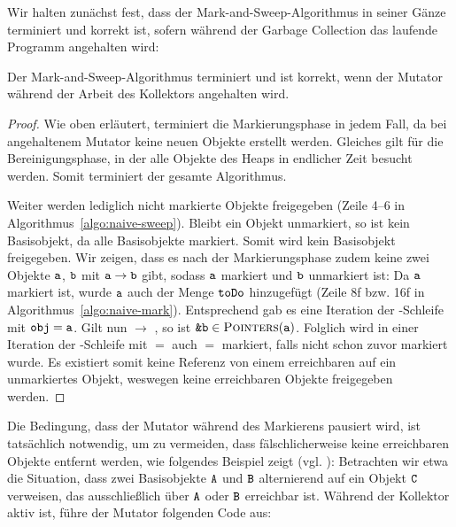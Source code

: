 Wir halten zunächst fest, dass der Mark-and-Sweep-Algorithmus in seiner Gänze terminiert und korrekt ist, sofern während der Garbage Collection das laufende Programm angehalten wird:

\begin{mybox}
\begin{satz}
	\label{satz:mark-sweep-correctness}
	Der Mark-and-Sweep-Algorithmus terminiert und ist korrekt, wenn der Mutator während der Arbeit des Kollektors angehalten wird.
\end{satz}
\end{mybox}

\begin{proof}
	Wie oben erläutert, terminiert die Markierungsphase in jedem Fall, da bei angehaltenem Mutator keine neuen Objekte erstellt werden.
	Gleiches gilt für die Bereinigungsphase, in der alle Objekte des Heaps in endlicher Zeit besucht werden.
	Somit terminiert der gesamte Algorithmus.
	
	Weiter werden lediglich nicht markierte Objekte freigegeben (Zeile 4--6 in Algorithmus~\ref{algo:naive-sweep}).
	Bleibt ein Objekt  unmarkiert, so ist  kein Basisobjekt, da  alle Basisobjekte markiert.
	Somit wird kein Basisobjekt freigegeben.
	Wir zeigen, dass es nach der Markierungsphase zudem keine zwei Objekte $\texttt{a}$, $\texttt{b}$ mit $\texttt{a} \rightarrow \texttt{b}$ gibt, sodass $\texttt{a}$ markiert und $\texttt{b}$ unmarkiert ist:
	Da $\texttt{a}$ markiert ist, wurde $\texttt{a}$ auch der Menge $\texttt{toDo}$ hinzugefügt (Zeile 8f bzw. 16f in Algorithmus~\ref{algo:naive-mark}).
	Entsprechend gab es eine Iteration der \WHILE-Schleife mit $\texttt{obj} = \texttt{a}$.
	Gilt nun  $\rightarrow$ , so ist $\texttt{\&b} \in \textsc{Pointers}(\texttt{a})$.
	Folglich wird in einer Iteration der \FOREACH-Schleife mit  $=$  auch  $=$  markiert, falls  nicht schon zuvor markiert wurde.
	Es existiert somit keine Referenz von einem erreichbaren auf ein unmarkiertes Objekt, weswegen keine erreichbaren Objekte freigegeben werden.
\end{proof}

Die Bedingung, dass der Mutator während des Markierens pausiert wird, ist tatsächlich notwendig, um zu vermeiden, dass fälschlicherweise keine erreichbaren Objekte entfernt werden, wie folgendes Beispiel zeigt (vgl. \cite[969]{dijkstra1978}):
Betrachten wir etwa die Situation, dass zwei Basisobjekte $\texttt{A}$ und $\texttt{B}$ alternierend auf ein Objekt $\texttt{C}$ verweisen, das ausschließlich über $\texttt{A}$ oder $\texttt{B}$ erreichbar ist.
Während der Kollektor aktiv ist, führe der Mutator folgenden Code aus:

